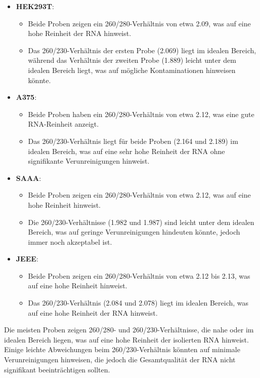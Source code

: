 \documentclass{article}
\begin{document}
\begin{itemize}
    \item \textbf{HEK293T}:
        \begin{itemize}
            \item Beide Proben zeigen ein 260/280-Verhältnis von etwa 2.09, was auf eine hohe Reinheit der RNA hinweist.
            \item Das 260/230-Verhältnis der ersten Probe (2.069) liegt im idealen Bereich, während das Verhältnis der zweiten Probe (1.889) leicht unter dem idealen Bereich liegt, was auf mögliche Kontaminationen hinweisen könnte.
        \end{itemize}

    \item \textbf{A375}:
        \begin{itemize}
            \item Beide Proben haben ein 260/280-Verhältnis von etwa 2.12, was eine gute RNA-Reinheit anzeigt.
            \item Das 260/230-Verhältnis liegt für beide Proben (2.164 und 2.189) im idealen Bereich, was auf eine sehr hohe Reinheit der RNA ohne signifikante Verunreinigungen hinweist.
        \end{itemize}
    
    \item \textbf{SAAA}:
        \begin{itemize}
            \item Beide Proben zeigen ein 260/280-Verhältnis von etwa 2.12, was auf eine hohe Reinheit hinweist.
            \item Die 260/230-Verhältnisse (1.982 und 1.987) sind leicht unter dem idealen Bereich, was auf geringe Verunreinigungen hindeuten könnte, jedoch immer noch akzeptabel ist.
        \end{itemize}
    \item \textbf{JEEE}:
        \begin{itemize}
            \item Beide Proben zeigen ein 260/280-Verhältnis von etwa 2.12 bis 2.13, was auf eine hohe Reinheit hinweist.
            \item Das 260/230-Verhältnis (2.084 und 2.078) liegt im idealen Bereich, was auf eine hohe Reinheit der RNA hinweist.
        \end{itemize}
\end{itemize}

Die meisten Proben zeigen 260/280- und 260/230-Verhältnisse, die nahe oder im idealen Bereich liegen, was auf eine hohe Reinheit der isolierten RNA hinweist. Einige leichte Abweichungen beim 260/230-Verhältnis könnten auf minimale Verunreinigungen hinweisen, die jedoch die Gesamtqualität der RNA nicht signifikant beeinträchtigen sollten.
\end{document}

